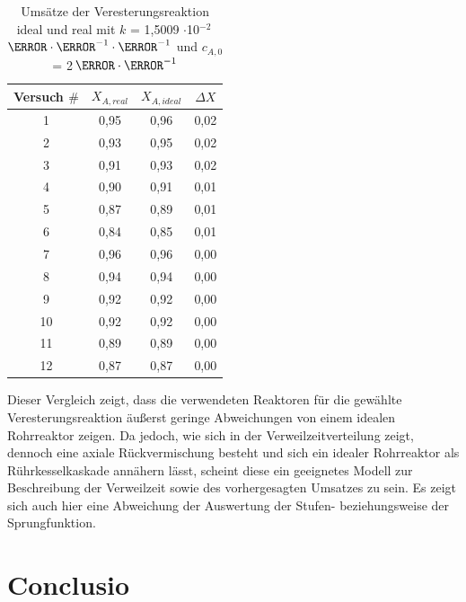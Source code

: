 \documentclass[12pt,liststotoc]{report}
\begin{document}
\begin{table}[H]
\centering
\caption{Umsätze der Veresterungsreaktion ideal und real mit $k$ = 1,5009 $\cdot  $10$^{-2}$\, $\litre\cdot\mole^{-1}\cdot\s^{-1}$ und $c_{A,0}$ = 2\,$\mole\cdot\litre^{-1}$}
\begin{tabular}{cccc}
\toprule 
Versuch $\#$ & $X_{A,real}$ & $X_{A,ideal}$ & $\Delta X$ \\
\midrule
1 & 0,95 & 0,96 & 0,02 \\
2 & 0,93 & 0,95 & 0,02 \\
3 & 0,91 & 0,93 & 0,02 \\
4 & 0,90 & 0,91 & 0,01 \\
5 & 0,87 & 0,89 & 0,01 \\
6 & 0,84 & 0,85 & 0,01 \\
7 & 0,96 & 0,96 & 0,00 \\
8 & 0,94 & 0,94 & 0,00 \\
9 & 0,92 & 0,92 & 0,00 \\
10 & 0,92 & 0,92 & 0,00 \\
11 & 0,89 & 0,89 & 0,00 \\
12 & 0,87 & 0,87 & 0,00 \\
\bottomrule
\end{tabular}
\label{tab:umsatz}
\end{table}
\noindent
Dieser Vergleich zeigt, dass die verwendeten Reaktoren für die gewählte Veresterungsreaktion äußerst geringe Abweichungen
von einem idealen Rohrreaktor zeigen. Da jedoch, wie sich in der Verweilzeitverteilung zeigt, dennoch eine axiale Rückvermischung besteht
und sich ein idealer Rohrreaktor als Rührkesselkaskade annähern lässt, scheint diese ein geeignetes Modell zur Beschreibung der Verweilzeit sowie des vorhergesagten Umsatzes zu sein.
Es zeigt sich auch hier eine Abweichung der Auswertung der Stufen- beziehungsweise der Sprungfunktion.





\chapter{Conclusio}
\end{document}
